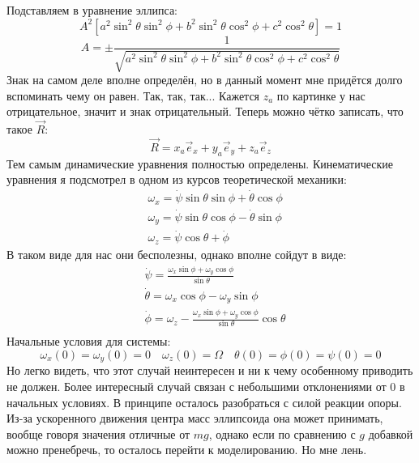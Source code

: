 Подставляем в уравнение эллипса:
\[
	A^2[a^2\sin^2 \theta \sin^2 \phi + b^2\sin^2 \theta \cos^2 \phi + c^2\cos^2 \theta] = 1
\]
\[
	A = \pm \frac{1}{\sqrt{a^2\sin^2 \theta \sin^2 \phi + b^2\sin^2 \theta \cos^2 \phi + c^2\cos^2 \theta}}
\]
Знак на самом деле вполне определён, но в данный момент мне придётся долго вспоминать чему он равен. Так, так, так... Кажется $z_a$ по картинке у нас отрицательное, значит и знак отрицательный. Теперь можно чётко записать, что такое $\vec{R}$:
\[
	\vec{R} = x_a \vec{e}_x + y_a \vec{e}_y + z_a \vec{e}_z
\]
Тем самым динамические уравнения полностью определены. Кинематические уравнения я подсмотрел в одном из курсов теоретической механики:
\[
	\begin{aligned}
	& \omega_x = \dot{\psi} \sin \theta \sin \phi + \dot{\theta} \cos \phi \\
	& \omega_y = \dot{\psi} \sin \theta \cos \phi - \dot{\theta} \sin \phi \\
	& \omega_z = \dot{\psi} \cos \theta + \dot{\phi}
	\end{aligned}
\]
В таком виде для нас они бесполезны, однако вполне сойдут в виде:
\[
	\begin{aligned}
	& \dot{\psi} = \frac{\omega_x \sin \phi + \omega_y \cos \phi}{\sin \theta} \\
	& \dot{\theta} = \omega_x \cos \phi - \omega_y \sin \phi \\
	& \dot{\phi} = \omega_z - \frac{\omega_x \sin \phi + \omega_y \cos \phi}{\sin \theta} \cos \theta \\
	\end{aligned}
\]
Начальные условия для системы:
\[
	\omega_x(0) = \omega_y(0) = 0
	\quad
	\omega_z(0) = \Omega 
	\quad
	\theta(0) = \phi(0) = \psi(0) = 0 
\]
Но легко видеть, что этот случай неинтересен и ни к чему особенному приводить не должен. Более интересный случай связан с небольшими отклонениями от 0 в начальных условиях. В принципе осталось разобраться с силой реакции опоры. Из-за ускоренного движения центра масс эллипсоида она может принимать, вообще говоря значения отличные от $mg$, однако если по сравнению с $g$ добавкой можно пренебречь, то осталось перейти к моделированию. Но мне лень.